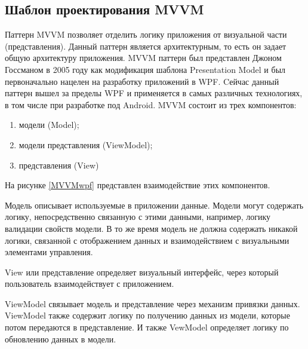 \subsection{Шаблон проектирования MVVM}

Паттерн MVVM  позволяет отделить логику приложения от визуальной части (представления). Данный паттерн является архитектурным, то есть он задает общую архитектуру приложения. MVVM паттерн был представлен Джоном Госсманом в 2005 году как модификация шаблона Presentation Model и был первоначально нацелен на разработку приложений в WPF\cite{2}. Cейчас данный паттерн вышел за пределы WPF и применяется в самых различных технологиях, в том числе при разработке под Android. MVVM состоит из трех компонентов:
\begin{enumerate}
	\item модели (Model);
	\item модели представления (ViewModel);
	\item представления (View)
\end{enumerate}
 На рисунке \ref{MVVMwpf} представлен взаимодействие этих компонентов.

Модель описывает используемые в приложении данные. Модели могут содержать логику, непосредственно связанную с этими данными, например, логику валидации свойств модели. В то же время модель не должна содержать никакой логики, связанной с отображением данных и взаимодействием с визуальными элементами управления. 

View или представление определяет визуальный интерфейс, через который пользователь взаимодействует с приложением. 

ViewModel связывает модель и представление через механизм привязки данных. ViewModel также содержит логику по получению данных из модели, которые потом передаются в представление. И также VewModel определяет логику по обновлению данных в модели.




\clearpage